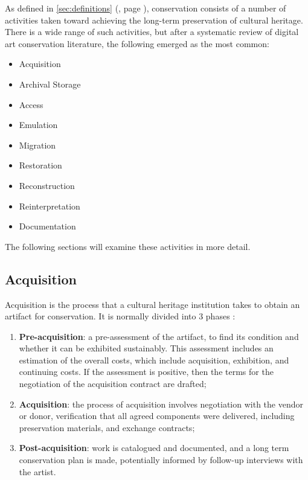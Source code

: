 As defined in \autoref{sec:definitions} (, page \pageref{sec:definitions}), conservation consists of a number of activities taken toward achieving the long-term preservation of cultural heritage. There is a wide range of such activities, but after a systematic review of digital art conservation literature, the following emerged as the most common:

\begin{itemize}
    \item Acquisition
    \item Archival Storage
    \item Access
    \item Emulation
    \item Migration
    \item Restoration
    \item Reconstruction
    \item Reinterpretation
    \item Documentation
\end{itemize}

The following sections will examine these activities in more detail.

\subsection{Acquisition}

Acquisition is the process that a cultural heritage institution takes to obtain an artifact for conservation. It is normally divided into 3 phases \cite{ahtilaAcquiringMediaArt1998}:

\begin{enumerate}
    \item \textbf{Pre-acquisition}: a pre-assessment of the artifact, to find its condition and whether it can be exhibited sustainably. This assessment includes an estimation of the overall costs, which include acquisition, exhibition, and continuing costs. If the assessment is positive, then the terms for the negotiation of the acquisition contract are drafted;
    \item  \textbf{Acquisition}: the process of acquisition involves negotiation with the vendor or donor, verification that all agreed components were delivered, including preservation materials, and exchange contracts;
    \item  \textbf{Post-acquisition}: work is catalogued and documented, and a long term conservation plan is made, potentially informed by follow-up interviews with the artist.
\end{enumerate}


